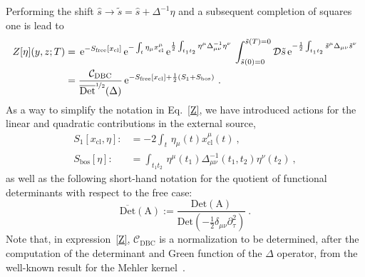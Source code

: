 \documentclass[12pt,a4paper]{article}
\numberwithin{equation}{section}
\numberwithin{equation}{section}
\begin{document}
Performing the shift $\hat{s} \to \tilde{s}=\hat{s}+\Delta^{-1}\eta$ and a subsequent completion of squares one is lead to 
\begin{align} \label{Z}
\begin{split}
Z[\eta](y,z;T)&= \, \mathrm{e}^{-S_{\mathrm{free}}[x_{\mathrm{cl}}]} \, \mathrm{e}^{-\int_{t} \eta_\mu x^\mu_{\mathrm{cl}}} \, \mathrm{e}^{\frac12 \int_{t_1t_2} \eta^\mu \Delta^{-1}_{\mu\nu} \eta^\nu} \, \int_{\tilde{s}(0)=0}^{\tilde{s}(T)=0} \mathcal{D}\tilde{s} \, \mathrm{e}^{-\frac12 \int_{t_1t_2} \tilde{s}^\mu \Delta_{\mu\nu} \tilde{s}^\nu}
\\
&=\frac{\mathcal{C}_{\mathrm{DBC}} }{{\overline{\mathrm{Det}}^{\nicefrac{1}{2}}(\Delta)}} \, \mathrm{e}^{-S_{\mathrm{free}}[x_{\mathrm{cl}}] +\frac{1}{2} (S_1+ S_{\rm bos})}\ .
\end{split}
\end{align}
As a way to simplify the notation in Eq.~\eqref{Z}, we have introduced
actions for the linear and quadratic contributions in the external source,
\begin{align} \label{S1}
S_1[x_{\mathrm{cl}},\eta]:&=-2\int_t \, \eta_\mu(t) x^\mu_{\mathrm{cl}}(t)\ ,
\\
\label{Sbos}
S_{\mathrm{bos}}[\eta]:&=\int_{t_1 t_2} \, \eta^\mu(t_1) \Delta^{-1}_{\mu\nu}(t_1,t_2) \eta^\nu(t_2)\ ,
\end{align}
as well as the following short-hand notation 
for the quotient of functional determinants with respect to the free case: 
\begin{equation*}
 \overline{\mathrm{Det}}(\mathrm{A}) := \frac{\mathrm{Det}(\mathrm{A})}{\mathrm{Det}\left(-\tfrac12\delta_{\mu\nu}\partial^2_{\tau}\right)}\ .
\end{equation*}
Note that, in expression~\eqref{Z}, $\mathcal{C}_{\mathrm{DBC}}$ is a normalization to be determined, after the computation of the determinant and Green function of the $\Delta$ operator, from the well-known result for the Mehler kernel~\cite{Vinas:2014exa, Franchino-Vinas:2021bcl}.
\end{document}
